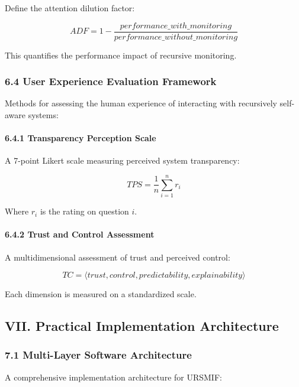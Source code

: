 \documentclass[
]{article}
\begin{document}
Define the attention dilution factor:

\[ADF = 1 - \frac{performance\_with\_monitoring}{performance\_without\_monitoring}\]

This quantifies the performance impact of recursive monitoring.

\subsubsection{6.4 User Experience Evaluation
Framework}\label{user-experience-evaluation-framework}

Methods for assessing the human experience of interacting with
recursively self-aware systems:

\paragraph{6.4.1 Transparency Perception
Scale}\label{transparency-perception-scale}

A 7-point Likert scale measuring perceived system transparency:

\[TPS = \frac{1}{n} \sum_{i=1}^n r_i\]

Where \(r_i\) is the rating on question \(i\).

\paragraph{6.4.2 Trust and Control
Assessment}\label{trust-and-control-assessment}

A multidimensional assessment of trust and perceived control:

\[TC = \langle trust, control, predictability, explainability \rangle\]

Each dimension is measured on a standardized scale.

\subsection{VII. Practical Implementation
Architecture}\label{vii.-practical-implementation-architecture}

\subsubsection{7.1 Multi-Layer Software
Architecture}\label{multi-layer-software-architecture}

A comprehensive implementation architecture for URSMIF:
\end{document}
